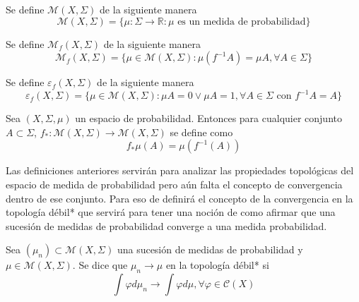 \begin{definicion}
	Se define $\mathcal{M}(X,\Sigma)$ de la siguiente manera	
	\begin{equation}
		\mathcal{M}(X,\Sigma) = \{\mu: \Sigma \rightarrow \mathbb{R}: \mu \text{ es un medida de probabilidad} \}
	\end{equation}
\end{definicion}

\begin{definicion}
	Se define $\mathcal{M}_f(X,\Sigma)$ de la siguiente manera	
	\begin{equation}
		\mathcal{M}_f(X,\Sigma) = \{ \mu \in \mathcal{M}(X,\Sigma): \mu(f^{-1} A) = \mu A, \forall A \in \Sigma \}
	\end{equation}
\end{definicion}

\begin{definicion}
	Se define $\varepsilon_f(X,\Sigma)$ de la siguiente manera	
	\begin{equation}
		\varepsilon_f(X,\Sigma) = \{ \mu \in \mathcal{M}(X,\Sigma): \mu A = 0 \vee \mu A = 1, \forall A \in \Sigma \text{ con } f^{-1}A = A  \}
	\end{equation}
\end{definicion}

\begin{definicion}
	Sea $(X,\Sigma,\mu)$ un espacio de probabilidad. Entonces para cualquier conjunto $A \subset \Sigma$, $f_*: \mathcal{M}(X,\Sigma) \rightarrow \mathcal{M}(X,\Sigma)$ se define como	
	\begin{equation}
		f_*\mu(A) = \mu(f^{-1}(A))
	\end{equation}
\end{definicion}

Las definiciones anteriores servirán para analizar las propiedades topológicas del espacio de medida de probabilidad pero aún falta el concepto de convergencia dentro de ese conjunto. Para eso de definirá el concepto de la convergencia en la topología débil* que servirá para tener una noción de como afirmar que una sucesión de medidas de probabilidad converge a una medida probabilidad.

\begin{definicion}
	Sea $(\mu_n) \subset \mathcal{M}(X,\Sigma)$ una sucesión de medidas de probabilidad y $\mu \in \mathcal{M}(X,\Sigma)$. Se dice que $\mu_n \rightarrow \mu$ en la topología débil* si
	\begin{equation}
		\int \varphi d\mu_n \rightarrow \int \varphi d\mu, \forall \varphi \in \mathcal{C}(X)
	\end{equation}
\end{definicion}

